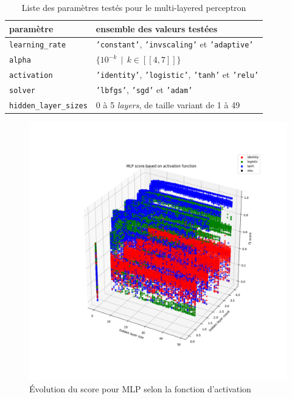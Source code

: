 \documentclass[a4paper]{report}
\begin{document}
\begin{table}
\centering
\begin{tabular}{ll}
paramètre & ensemble des valeurs testées \\
\hline
\texttt{learning\_rate} & \texttt{'constant'}, \texttt{'invscaling'} et \texttt{'adaptive'}\\
\texttt{alpha} & $\{10^{-k} \>\> | \>\> k \in [\![4, 7]\!] \}$ \\
\texttt{activation} & \texttt{'identity'}, \texttt{'logistic'}, \texttt{'tanh'} et \texttt{'relu'} \\
\texttt{solver} & \texttt{'lbfgs'}, \texttt{'sgd'} et \texttt{'adam'}\\
\texttt{hidden\_layer\_sizes} & 0 à 5 \emph{layers}, de taille variant de 1 à 49\\
\end{tabular}
\caption{Liste des paramètres testés pour le multi-layered perceptron\label{params_mlp}}
\end{table}

\begin{figure}
\centering
\includegraphics[width=\textwidth]{img/mlp_activation.png}
\caption{Évolution du score pour MLP selon la fonction d'activation\label{mlp_activation}}
\end{figure}
\end{document}
